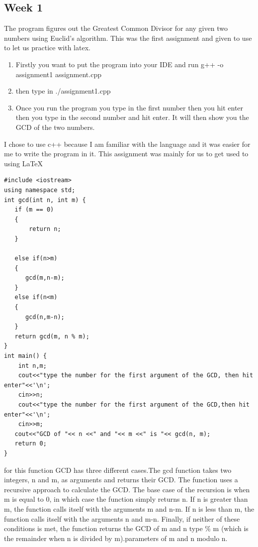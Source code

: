 \documentclass{article}
\theoremstyle{theorem}
\theoremstyle{definition}
\theoremstyle{remark}
\begin{document}
\subsection{Week 1}
 The program figures out the Greatest Common Divisor for any given two numbers using Euclid’s algorithm. This was the first assignment and given to use to let us practice with latex.
\begin{enumerate}

\item Firstly you want to put the program into your IDE and run g++ -o assignment1 assignment.cpp
\item then type in ./assignment1.cpp
\item Once you run the program you type in the first number then you hit enter then you type in the second number and hit enter. It will then show you the GCD of the two numbers.
    \end{enumerate}
      I chose to use c++ because I am familiar with the language and it was easier for me to write the program in it. This assignment was mainly for us to get used to using LaTeX
\begin{lstlisting}
#include <iostream>
using namespace std;
int gcd(int n, int m) {
   if (m == 0)
   {
       return n;
   }
  
   else if(n>m)
   {
      gcd(m,n-m);
   }
   else if(n<m)
   {
      gcd(n,m-n);
   }
   return gcd(m, n % m);
}
int main() {
    int n,m;
    cout<<"type the number for the first argument of the GCD, then hit enter"<<'\n';
    cin>>n;
    cout<<"type the number for the first argument of the GCD,then hit enter"<<'\n';
    cin>>m;
   cout<<"GCD of "<< n <<" and "<< m <<" is "<< gcd(n, m);
   return 0;
}
\end{lstlisting}
for this function GCD has three different cases.The gcd function takes two integers, n and m, as arguments and returns their GCD. The function uses a recursive approach to calculate the GCD. The base case of the recursion is when m is equal to 0, in which case the function simply returns n. If n is greater than m, the function calls itself with the arguments m and n-m. If n is less than m, the function calls itself with the arguments n and m-n. Finally, if neither of these conditions is met, the function returns the GCD of m and n type \% m (which is the remainder when n is divided by m).parameters of m and n modulo n.
\end{document}
